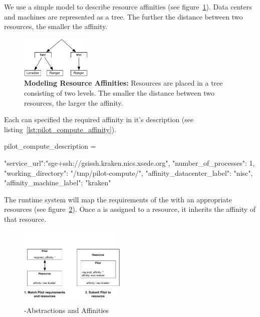 \documentclass[conference]{IEEEtran}
\begin{document}
We use a simple model to describe resource affinities (see
figure~\ref{fig:figures_resource-topologies}). Data centers and machines are
represented as a tree. The further the distance between two resources, the
smaller the affinity.

\begin{figure}[t]
	\centering
		\includegraphics[width=0.3\textwidth]{figures/resource-topologies.pdf}
	\caption{\textbf{Modeling Resource Affinities:} Resources are placed in a 
	tree consisting of two levels. The smaller the distance between two 
	resources, the larger the affinity.}
	\label{fig:figures_resource-topologies}
\end{figure}

Each \pilot can specified the required affinity in it's description (see
listing~\ref{lst:pilot_compute_affinity}).

\begin{code}[
caption={Creation of a \textit{PilotCompute} on the specified  compute
resource endpoint.},
label={lst:pilot_compute_affinity}]
pilot_compute_description = 

{
    "service_url":"sge+ssh://gsissh.kraken.nics.xsede.org",
    "number_of_processes": 1,                             
    "working_directory": "/tmp/pilot-compute/",
    "affinity_datacenter_label": "nisc",              
    "affinity_machine_label": "kraken" 
}
\end{code}

The runtime system will map the requirements of the \pilot with an appropriate
resources (see figure~\ref{fig:figures_pilot-affinities}). Once a \pilot is
assigned to a resource, it inherits the affinity of that resource.

\begin{figure}[t]
	\centering
	\includegraphics[width=0.45\textwidth]{figures/pilot-affinities.pdf}
	\caption{\pilot-Abstractions and Affinities}
	\label{fig:figures_pilot-affinities}
\end{figure}
\end{document}
